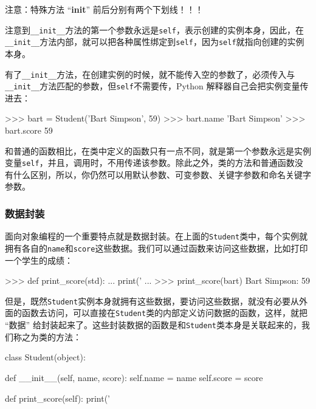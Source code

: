 注意：特殊方法 ``\textbf{init}'' 前后分别有两个下划线！！！

注意到\texttt{\_\_init\_\_}方法的第一个参数永远是\texttt{self}，表示创建的实例本身，因此，在\texttt{\_\_init\_\_}方法内部，就可以把各种属性绑定到\texttt{self}，因为\texttt{self}就指向创建的实例本身。

有了\texttt{\_\_init\_\_}方法，在创建实例的时候，就不能传入空的参数了，必须传入与\texttt{\_\_init\_\_}方法匹配的参数，但\texttt{self}不需要传，Python
解释器自己会把实例变量传进去：

\begin{pythoncode}
>>> bart = Student('Bart Simpson', 59)
>>> bart.name
'Bart Simpson'
>>> bart.score
59
\end{pythoncode}

和普通的函数相比，在类中定义的函数只有一点不同，就是第一个参数永远是实例变量\texttt{self}，并且，调用时，不用传递该参数。除此之外，类的方法和普通函数没有什么区别，所以，你仍然可以用默认参数、可变参数、关键字参数和命名关键字参数。

\hypertarget{ux6570ux636eux5c01ux88c5}{%
\subsubsection{数据封装}\label{ux6570ux636eux5c01ux88c5}}

面向对象编程的一个重要特点就是数据封装。在上面的\texttt{Student}类中，每个实例就拥有各自的\texttt{name}和\texttt{score}这些数据。我们可以通过函数来访问这些数据，比如打印一个学生的成绩：

\begin{pythoncode}
>>> def print_score(std):
...     print('%
...
>>> print_score(bart)
Bart Simpson: 59
\end{pythoncode}

但是，既然\texttt{Student}实例本身就拥有这些数据，要访问这些数据，就没有必要从外面的函数去访问，可以直接在\texttt{Student}类的内部定义访问数据的函数，这样，就把
``数据''
给封装起来了。这些封装数据的函数是和\texttt{Student}类本身是关联起来的，我们称之为类的方法：

\begin{pythoncode}
class Student(object):

    def __init__(self, name, score):
        self.name = name
        self.score = score

    def print_score(self):
        print('%
\end{pythoncode}

